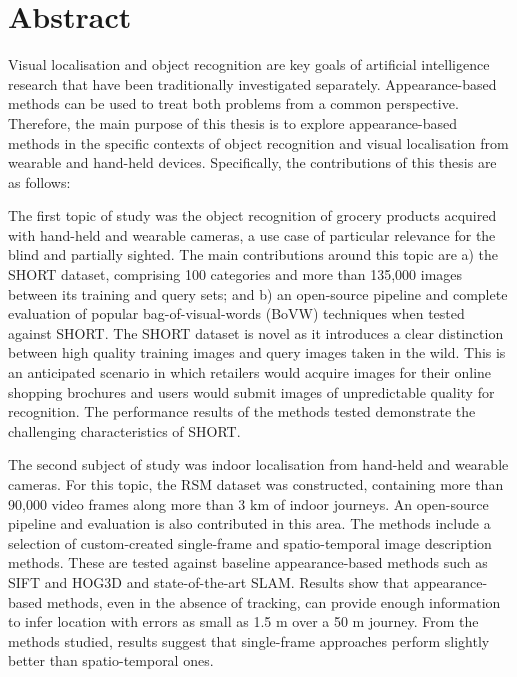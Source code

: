 \begingroup
\let\clearpage\relax
\let\cleardoublepage\relax
\let\cleardoublepage\relax

\chapter*{Abstract}

Visual localisation and object recognition are key goals of artificial intelligence research that have been traditionally investigated separately. Appearance-based methods can be used to treat both problems from a common perspective. Therefore, the main purpose of this thesis is to explore appearance-based methods in the specific contexts of object recognition and visual localisation from wearable and hand-held devices. Specifically, the contributions of this thesis are as follows:

The first topic of study was the object recognition of grocery products acquired with hand-held and wearable cameras, a use case of particular relevance for the blind and partially sighted. The main contributions around this topic are a) the SHORT dataset, comprising 100 categories and more than 135,000 images between its training and query sets; and b) an open-source pipeline and complete evaluation of popular bag-of-visual-words (BoVW) techniques when tested against SHORT. The SHORT dataset is novel as it introduces a clear distinction between high quality training images and query images taken in the wild. This is an anticipated scenario in which retailers would acquire images for their online shopping brochures and users would submit images of unpredictable quality for recognition. The performance results of the methods tested demonstrate the challenging characteristics of SHORT.

The second subject of study was indoor localisation from hand-held and wearable cameras. For this topic, the RSM dataset was constructed, containing more than 90,000 video frames along more than 3 km of indoor journeys. An open-source pipeline and evaluation is also contributed in this area. The methods include a selection of custom-created single-frame and spatio-temporal image description methods. These are tested against baseline appearance-based methods such as SIFT and HOG3D and state-of-the-art SLAM. Results show that appearance-based methods, even in the absence of tracking, can provide enough information to infer location with errors as small as 1.5 m over a 50 m journey. From the methods studied, results suggest that single-frame approaches perform slightly better than spatio-temporal ones.

